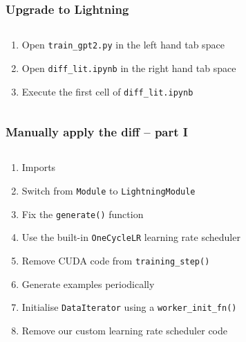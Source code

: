 \documentclass[
	notes=none,
	aspectratio=169
]{beamer}
\begin{document}
\begin{frame}
\frametitle{Upgrade to Lightning}

\begin{columns}[T]
\begin{column}[T]{1.0\textwidth}
\setlength{\parskip}{0.5em}

\vspace{0.0cm}
\begin{enumerate}
\setlength{\parskip}{0.5em}
\item Open {\tt train\_gpt2.py} in the left hand tab space
\item Open {\tt diff\_lit.ipynb} in the right hand tab space
\item Execute the first cell of {\tt diff\_lit.ipynb}
\end{enumerate}

\end{column}
\end{columns}

\end{frame}
\note{
}


\begin{frame}
\frametitle{Manually apply the diff -- part I}

\begin{columns}[T]
\begin{column}[T]{1.0\textwidth}
\setlength{\parskip}{0.5em}

\vspace{0.0cm}
\begin{enumerate}
\setlength{\parskip}{0.0em}
\item Imports
\item Switch from {\tt Module} to {\tt LightningModule}
\item Fix the {\tt generate()} function
\item Use the built-in {\tt OneCycleLR} learning rate scheduler
\item Remove CUDA code from {\tt training\_step()}
\item Generate examples periodically
\item Initialise {\tt DataIterator} using a {\tt worker\_init\_fn()}
\item Remove our custom learning rate scheduler code
\end{enumerate}

\end{column}
\end{columns}

\end{frame}
\note{
}
\end{document}
